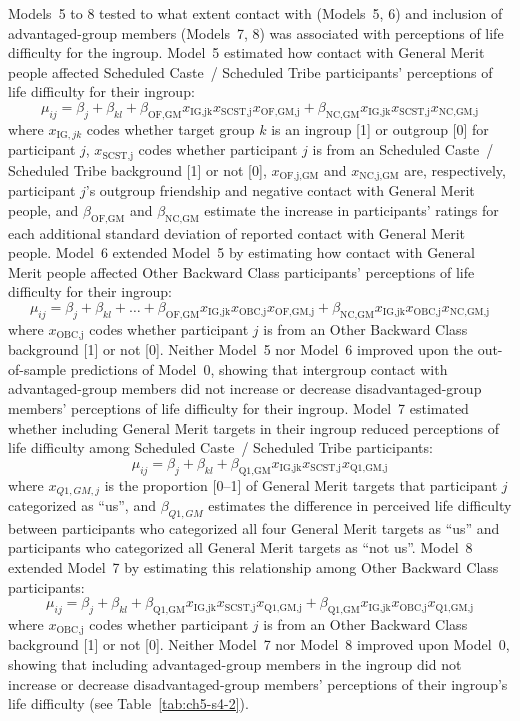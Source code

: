 \documentclass[12pt, a4paper]{article}
\begin{document}
Models~5 to 8 tested to what extent contact with (Models~5, 6) and inclusion of advantaged-group members (Models~7, 8) was associated with perceptions of life difficulty for the ingroup. Model~5 estimated how contact with General Merit people affected Scheduled Caste~/ Scheduled Tribe participants' perceptions of life difficulty for their ingroup: $$ \mu_{ij} = \beta_{j} + \beta_{kl} + \beta_\text{OF,GM}x_{\text{IG,jk}}x_{\text{SCST,j}}x_\text{OF,GM,j} + \beta_\text{NC,GM}x_{\text{IG,jk}}x_{\text{SCST,j}}x_\text{NC,GM,j} $$ where $x_{\text{IG},jk}$ codes whether target group $k$ is an ingroup [1] or outgroup [0] for participant $j$, $x_{\text{SCST,j}}$ codes whether participant $j$ is from an Scheduled Caste~/ Scheduled Tribe background [1] or not [0], $x_\text{OF,j,GM}$ and $x_\text{NC,j,GM}$ are, respectively, participant $j$'s outgroup friendship and negative contact with General Merit people, and $\beta_\text{OF,GM}$ and $\beta_\text{NC,GM}$ estimate the increase in participants' ratings for each additional standard deviation of reported contact with General Merit people. Model~6 extended Model~5 by estimating how contact with General Merit people affected Other Backward Class participants' perceptions of life difficulty for their ingroup: $$ \mu_{ij} = \beta_{j} + \beta_{kl} + \ldots + \beta_\text{OF,GM}x_{\text{IG,jk}}x_{\text{OBC,j}}x_\text{OF,GM,j} + \beta_\text{NC,GM}x_{\text{IG,jk}}x_{\text{OBC,j}}x_\text{NC,GM,j} $$ where $x_{\text{OBC,j}}$ codes whether participant $j$ is from an Other Backward Class background [1] or not [0]. Neither Model~5 nor Model~6 improved upon the out-of-sample predictions of Model~0, showing that intergroup contact with advantaged-group members did not increase or decrease disadvantaged-group members' perceptions of life difficulty for their ingroup. Model~7 estimated whether including General Merit targets in their ingroup reduced perceptions of life difficulty among Scheduled Caste~/ Scheduled Tribe participants: $$ \mu_{ij} = \beta_{j} + \beta_{kl} + \beta_\text{Q1,GM}x_{\text{IG,jk}}x_{\text{SCST,j}}x_\text{Q1,GM,j} $$ where $x_{Q1,GM,j}$ is the proportion [0--1] of General Merit targets that participant $j$ categorized as ``us'', and $\beta_{Q1,GM}$ estimates the difference in perceived life difficulty between participants who categorized all four General Merit targets as ``us'' and participants who categorized all General Merit targets as ``not us''. Model~8 extended Model~7 by estimating this relationship among Other Backward Class participants: $$ \mu_{ij} = \beta_{j} + \beta_{kl} + \beta_\text{Q1,GM}x_{\text{IG,jk}}x_{\text{SCST,j}}x_\text{Q1,GM,j} + \beta_\text{Q1,GM}x_{\text{IG,jk}}x_{\text{OBC,j}}x_\text{Q1,GM,j} $$ where $x_{\text{OBC,j}}$ codes whether participant $j$ is from an Other Backward Class background [1] or not [0]. Neither Model~7 nor Model~8 improved upon Model~0, showing that including advantaged-group members in the ingroup did not increase or decrease disadvantaged-group members' perceptions of their ingroup's life difficulty (see Table~\ref{tab:ch5-s4-2}).
\end{document}
